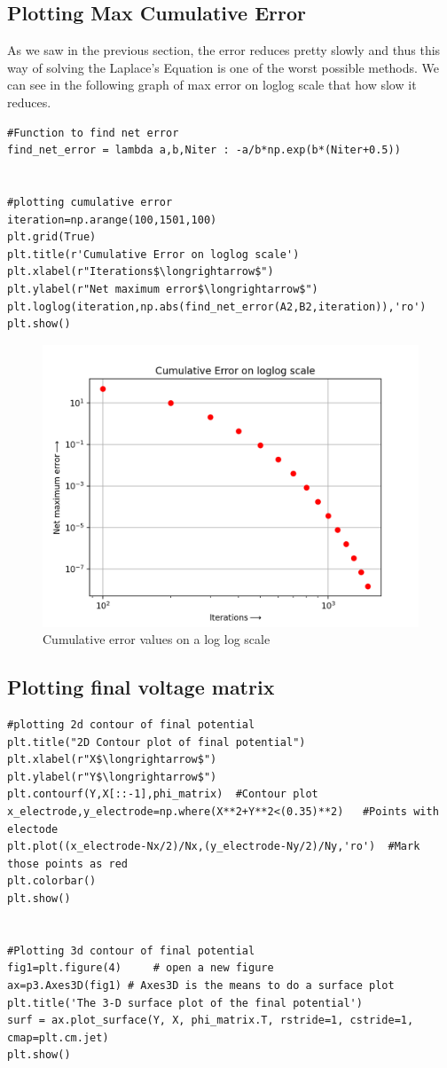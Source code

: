 \documentclass[11pt, a4paper]{article}
\begin{document}
\subsection{Plotting Max Cumulative Error}
As we saw in the previous section, the error reduces pretty slowly and thus this way of solving the Laplace's Equation is one of the worst possible methods. We can see in the following graph of max error on loglog scale that how slow it reduces.
\begin{lstlisting}
#Function to find net error
find_net_error = lambda a,b,Niter : -a/b*np.exp(b*(Niter+0.5))


#plotting cumulative error
iteration=np.arange(100,1501,100)
plt.grid(True)
plt.title(r'Cumulative Error on loglog scale')
plt.xlabel(r"Iterations$\longrightarrow$")
plt.ylabel(r"Net maximum error$\longrightarrow$")
plt.loglog(iteration,np.abs(find_net_error(A2,B2,iteration)),'ro')
plt.show()
\end{lstlisting}
\begin{figure}[h!]
\centering
\includegraphics[scale=0.6]{Fig-4.png}
\caption{Cumulative error values on a log log scale}
\label{fig:3d Plot of Potential}
\end{figure}

\subsection{Plotting final voltage matrix}
\begin{lstlisting}
#plotting 2d contour of final potential
plt.title("2D Contour plot of final potential")
plt.xlabel(r"X$\longrightarrow$")
plt.ylabel(r"Y$\longrightarrow$")
plt.contourf(Y,X[::-1],phi_matrix)  #Contour plot
x_electrode,y_electrode=np.where(X**2+Y**2<(0.35)**2)   #Points with electode
plt.plot((x_electrode-Nx/2)/Nx,(y_electrode-Ny/2)/Ny,'ro')  #Mark those points as red
plt.colorbar()
plt.show()


#Plotting 3d contour of final potential
fig1=plt.figure(4)     # open a new figure
ax=p3.Axes3D(fig1) # Axes3D is the means to do a surface plot
plt.title('The 3-D surface plot of the final potential')
surf = ax.plot_surface(Y, X, phi_matrix.T, rstride=1, cstride=1, cmap=plt.cm.jet)
plt.show()
\end{lstlisting}
\end{document}
